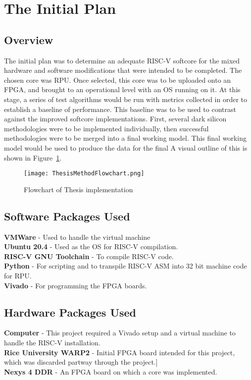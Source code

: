 \section{The Initial Plan}
	\subsection{Overview}
		The initial plan was to determine an adequate RISC-V softcore for the mixed hardware and software modifications that were intended to be completed. The chosen core was RPU. Once selected, this core was to be uploaded onto an FPGA, and brought to an operational level with an OS running on it. At this stage, a series of test algorithms would be run with metrics collected in order to establish a baseline of performance. This baseline was to be used to contrast against the improved softcore implementations. First, several dark silicon methodologies were to be implemented individually, then successful methodologies were to be merged into a final working model. This final working model would be used to produce the data for the final A visual outline of this is shown in Figure~\ref{ThesisFlowchart}. 
		
		\begin{figure}
			\centering
			\texttt{[image: ThesisMethodFlowchart.png]}
			\caption{Flowchart of Thesis implementation}
			\label{ThesisFlowchart}
		\end{figure}

	
	\subsection{Software Packages Used}
		\textbf{VMWare} - Used to handle the virtual machine\\
		\textbf{Ubuntu 20.4} - Used as the OS for RISC-V compilation.\\
		\textbf{RISC-V GNU Toolchain} - To compile RISC-V code.\\
		\textbf{Python} - For scripting and to transpile RISC-V ASM into 32 bit machine code for RPU. \\
		\textbf{Vivado} - For programming the FPGA boards. 
	
	\subsection{Hardware Packages Used}
		\textbf{Computer} - This project required a Vivado setup and a virtual machine to handle the RISC-V installation.\\
		\textbf{Rice University WARP2} - Initial FPGA board intended for this project, which was discarded partway through the project.]\\
		\textbf{Nexys 4 DDR} - An FPGA board on which a core was implemented.
	
